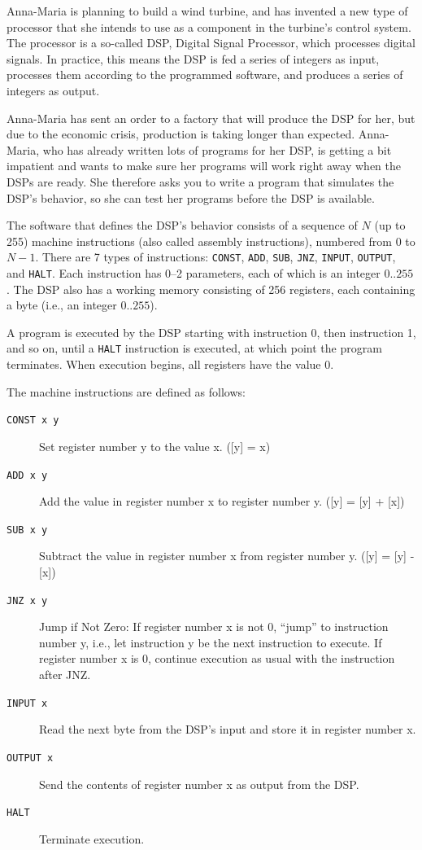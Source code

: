 
Anna-Maria is planning to build a wind turbine, and has invented a new type of processor that she intends to use as a component in the turbine's control system. The processor is a so-called DSP, Digital Signal Processor, which processes digital signals. In practice, this means the DSP is fed a series of integers as input, processes them according to the programmed software, and produces a series of integers as output.

Anna-Maria has sent an order to a factory that will produce the DSP for her, but due to the economic crisis, production is taking longer than expected. Anna-Maria, who has already written lots of programs for her DSP, is getting a bit impatient and wants to make sure her programs will work right away when the DSPs are ready. She therefore asks you to write a program that simulates the DSP's behavior, so she can test her programs before the DSP is available.

The software that defines the DSP's behavior consists of a sequence of $N$ (up to 255) machine instructions (also called assembly instructions), numbered from $0$ to $N-1$. There are 7 types of instructions: \texttt{CONST}, \texttt{ADD}, \texttt{SUB}, \texttt{JNZ}, \texttt{INPUT}, \texttt{OUTPUT}, and \texttt{HALT}. Each instruction has 0--2 parameters, each of which is an integer $0..255$. The DSP also has a working memory consisting of 256 registers, each containing a byte (i.e., an integer $0..255$).

A program is executed by the DSP starting with instruction 0, then instruction 1, and so on, until a \texttt{HALT} instruction is executed, at which point the program terminates. When execution begins, all registers have the value 0.

The machine instructions are defined as follows:

\begin{description}
\item[\texttt{CONST x y}] Set register number y to the value x. ([y] = x)
\item[\texttt{ADD x y}] Add the value in register number x to register number y. ([y] = [y] + [x])
\item[\texttt{SUB x y}] Subtract the value in register number x from register number y. ([y] = [y] - [x])
\item[\texttt{JNZ x y}] Jump if Not Zero: If register number x is not 0, ``jump'' to instruction number y, i.e., let instruction y be the next instruction to execute. If register number x is 0, continue execution as usual with the instruction after JNZ.
\item[\texttt{INPUT x}] Read the next byte from the DSP's input and store it in register number x.
\item[\texttt{OUTPUT x}] Send the contents of register number x as output from the DSP.
\item[\texttt{HALT}] Terminate execution.
\end{description}

